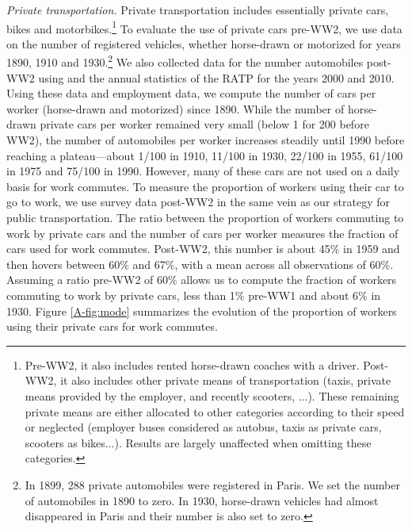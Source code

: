 \documentclass[11pt]{report}
\begin{document}
\noindent\textit{Private transportation.} Private transportation includes essentially private cars, bikes and motorbikes.\footnote{Pre-WW2, it also includes rented horse-drawn coaches with a driver. Post-WW2, it also includes other private means of transportation (taxis, private means provided by the employer, and recently scooters, ...). These remaining private means are either allocated to other categories according to their speed or neglected (employer buses considered as autobus, taxis as private cars, scooters as bikes...). Results are largely unaffected when omitting these categories.} To evaluate the use of private cars pre-WW2, we use data on the number of registered vehicles, whether horse-drawn or motorized for years 1890, 1910 and 1930.\footnote{In 1899, 288 private automobiles were registered in Paris. We set the number of automobiles in 1890 to zero. In 1930, horse-drawn vehicles had almost disappeared in Paris and their number is also set to zero.} We also collected data for the number automobiles post-WW2 using \cite{merlin1997transports} and the annual statistics of the RATP for the years 2000 and 2010. Using these data and employment data, we compute the number of cars per worker (horse-drawn and motorized) since 1890. While the number of horse-drawn private cars per worker remained very small (below 1 for 200 before WW2), the number of automobiles per worker increases steadily until 1990 before reaching a plateau---about 1/100 in 1910, 11/100 in 1930, 22/100 in 1955, 61/100 in 1975 and 75/100 in 1990. However, many of these cars are not used on a daily basis for work commutes. To measure the proportion of workers using their car to go to work, we use survey data post-WW2 in the same vein as our strategy for public transportation. The ratio between the proportion of workers commuting to work by private cars and the number of cars per worker measures the fraction of cars used for work commutes. Post-WW2, this number is about 45\% in 1959 and then hovers between 60\% and 67\%, with a mean across all observations of 60\%. Assuming a ratio pre-WW2 of 60\% allows us to compute the fraction of workers commuting to work by private cars, less than 1\% pre-WW1 and about 6\% in 1930. Figure \ref{A-fig:mode} summarizes the evolution of the proportion of workers using their private cars for work commutes.
\end{document}
